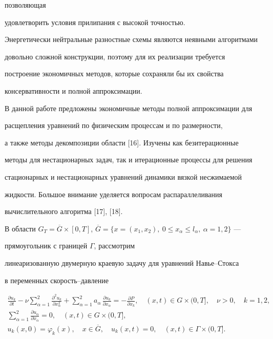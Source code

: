 позволяющая


удовлетворить условия прилипания с высокой точностью.





Энергетически нейтральные разностные схемы являются неявными алгоритмами


довольно сложной конструкции, поэтому для их реализации требуется


построение экономичных методов, которые сохраняли бы их свойства


консервативности и полной аппроксимации.





В данной работе предложены экономичные методы полной аппроксимации для


расщепления уравнений по физическим процессам и по размерности,


а также методы декомпозиции области [16]. Изучены как безитерационные


методы для нестационарных задач, так и итерационные процессы для решения


стационарных и нестационарных уравнений динамики вязкой несжимаемой


жидкости. Большое внимание уделяется вопросам распараллеливания


вычислительного алгоритма [17], [18].





В области $G_T=\overline G\times [0,T]$, $\overline G=


\{x=(x_1,x_2),\ 0\leq x_\alpha\leq l_\alpha,\ \alpha=1,2\}$ ---


прямоугольник с границей $\Gamma$, рассмотрим


линеаризованную двумерную краевую задачу для уравнений Навье--Стокса


в переменных скорость--давление


\begin{gather}


\frac{\partial u_k}{\partial t}-\nu\sum_{\alpha=1}^2\frac{\partial^2u_k}{


\partial x_\alpha^2}+\sum_{\alpha=1}^2a_\alpha\,\frac{\partial


u_k}{\partial


x_\alpha}=-\frac{\partial P}{\partial x_k},\quad


(x,t)\in G\times (0,T],\quad


\nu>0,\quad k=1,2,\\


\sum_{\alpha=1}^2\frac{\partial u_\alpha}{\partial x_\alpha}=0,\quad


(x,t)\in G\times (0,T],\\


u_k(x,0)=\varphi_k(x),\quad x\in \overline G,\quad


u_k(x,t)=0,\quad (x,t)\in \Gamma\times (0,T].


\end{gather}


